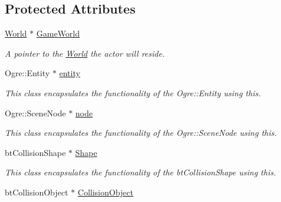 \subsection*{Protected Attributes}
\begin{DoxyCompactItemize}
\item 
\hypertarget{classphys_1_1ActorBase_a0ffbb74296ac96db26c890274df794a2}{
\hyperlink{classphys_1_1World}{World} $\ast$ \hyperlink{classphys_1_1ActorBase_a0ffbb74296ac96db26c890274df794a2}{GameWorld}}
\label{d8/d0f/classphys_1_1ActorBase_a0ffbb74296ac96db26c890274df794a2}

\begin{DoxyCompactList}\small\item\em A pointer to the \hyperlink{classphys_1_1World}{World} the actor will reside. \item\end{DoxyCompactList}\item 
\hypertarget{classphys_1_1ActorBase_ae44969ba242ca5c13a608b7467be0674}{
Ogre::Entity $\ast$ \hyperlink{classphys_1_1ActorBase_ae44969ba242ca5c13a608b7467be0674}{entity}}
\label{d8/d0f/classphys_1_1ActorBase_ae44969ba242ca5c13a608b7467be0674}

\begin{DoxyCompactList}\small\item\em This class encapsulates the functionality of the Ogre::Entity using this. \item\end{DoxyCompactList}\item 
\hypertarget{classphys_1_1ActorBase_a687bfa0cc44adf715651c7ac41a46321}{
Ogre::SceneNode $\ast$ \hyperlink{classphys_1_1ActorBase_a687bfa0cc44adf715651c7ac41a46321}{node}}
\label{d8/d0f/classphys_1_1ActorBase_a687bfa0cc44adf715651c7ac41a46321}

\begin{DoxyCompactList}\small\item\em This class encapsulates the functionality of the Ogre::SceneNode using this. \item\end{DoxyCompactList}\item 
\hypertarget{classphys_1_1ActorBase_a643613ce7abb4b6d4352bab036b7cf69}{
btCollisionShape $\ast$ \hyperlink{classphys_1_1ActorBase_a643613ce7abb4b6d4352bab036b7cf69}{Shape}}
\label{d8/d0f/classphys_1_1ActorBase_a643613ce7abb4b6d4352bab036b7cf69}

\begin{DoxyCompactList}\small\item\em This class encapsulates the functionality of the btCollisionShape using this. \item\end{DoxyCompactList}\item 
\hypertarget{classphys_1_1ActorBase_a70676c52ffee64705a7b463d29b60429}{
btCollisionObject $\ast$ \hyperlink{classphys_1_1ActorBase_a70676c52ffee64705a7b463d29b60429}{CollisionObject}}
\label{d8/d0f/classphys_1_1ActorBase_a70676c52ffee64705a7b463d29b60429}


\end{DoxyCompactItemize}
